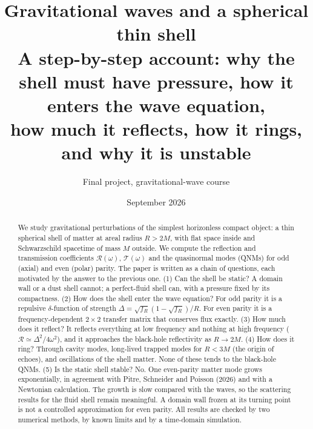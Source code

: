 \documentclass[11pt,a4paper]{article}
\title{\textbf{Gravitational waves and a spherical thin shell}\\[4pt]
\large A step-by-step account: why the shell must have pressure, how it enters the wave equation,\\
how much it reflects, how it rings, and why it is unstable}
\author{Final project, gravitational-wave course}
\date{September 2026}
\numberwithin{equation}{section}
\newcommand{\sq}{\sqrt{f_R}}
\newcommand{\RR}{\mathcal R}
\newcommand{\TT}{\mathcal T}
\begin{document}
\maketitle

\begin{abstract}
We study gravitational perturbations of the simplest horizonless compact object: a thin spherical shell of matter
at areal radius $R>2M$, with flat space inside and Schwarzschild spacetime of mass $M$ outside. We compute the
reflection and transmission coefficients $\RR(\omega)$, $\TT(\omega)$ and the quasinormal modes (QNMs) for odd (axial)
and even (polar) parity. The paper is written as a chain of questions, each motivated by the answer to the previous
one. (1) Can the shell be static? A domain wall or a dust shell cannot; a perfect-fluid shell can, with a pressure
fixed by its compactness. (2) How does the shell enter the wave equation? For odd parity it is a repulsive
$\delta$-function of strength $\Delta=\sq(1-\sq)/R$. For even parity it is a frequency-dependent $2\times2$ transfer
matrix that conserves flux exactly. (3) How much does it reflect? It reflects everything at low frequency and nothing
at high frequency ($\RR\simeq\Delta^2/4\omega^2$), and it approaches the black-hole reflectivity as $R\to2M$. (4) How
does it ring? Through cavity modes, long-lived trapped modes for $R<3M$ (the origin of echoes), and oscillations of the
shell matter. None of these tends to the black-hole QNMs. (5) Is the static shell stable? No. One even-parity matter
mode grows exponentially, in agreement with Pitre, Schneider and Poisson (2026) and with a Newtonian calculation. The
growth is slow compared with the waves, so the scattering results for the fluid shell remain meaningful. A domain wall
frozen at its turning point is not a controlled approximation for even parity. All results are checked by two
numerical methods, by known limits and by a time-domain simulation.
\end{abstract}

\tableofcontents
\newpage

\end{document}
